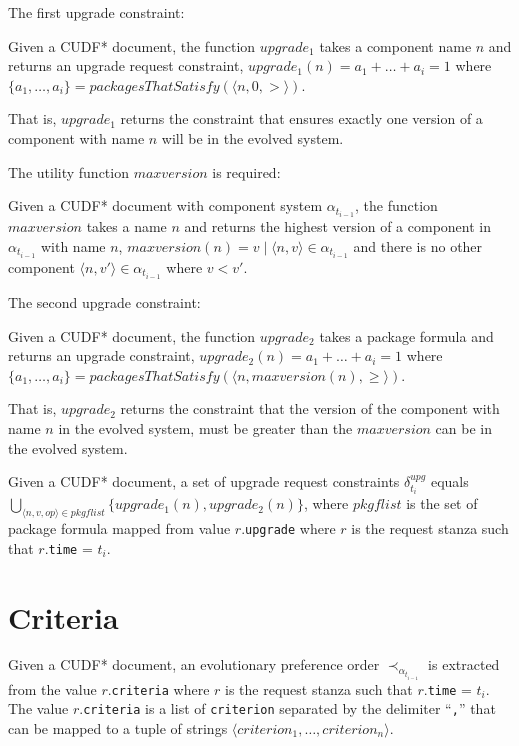 The first upgrade constraint:
\begin{defs}
Given a CUDF* document, the function  $upgrade_1$ takes a component name $n$ and returns an upgrade request constraint, 
$upgrade_1(n) = a_1 + \ldots + a_i = 1$ where $\{a_1,\ldots,a_i\} = packagesThatSatisfy(\langle n,0,>\rangle)$. 
\end{defs}
That is, $upgrade_1$ returns the constraint that ensures exactly one version of a component with name $n$ will be in the evolved system.

The utility function $maxversion$ is required:
\begin{defs}
Given a CUDF* document with component system $\alpha_{t_{i-1}}$, the function $maxversion$ takes a name $n$ and returns the highest version of a component in $\alpha_{t_{i-1}}$ with name $n$,
$maxversion(n) = v  \mid \langle n,v \rangle \in \alpha_{t_{i-1}}$ and there is no other component $\langle n,v' \rangle \in \alpha_{t_{i-1}}$ where $v < v'$.
\end{defs}

The second upgrade constraint:
\begin{defs}
Given a CUDF* document, the function $upgrade_2$ takes a package formula and returns an upgrade constraint,
$upgrade_2(n) = a_1 + \ldots + a_i = 1$ where $\{a_1,\ldots,a_i\} = packagesThatSatisfy(\langle n,maxversion(n),\geq\rangle)$. 
\end{defs}
That is, $upgrade_2$ returns the constraint that the version of the component with name $n$ in the evolved system, must be greater than the $maxversion$ can be in the evolved system.

\begin{defs}
Given a CUDF* document, a set of upgrade request constraints $\delta_{t_i}^{upg}$ equals $\bigcup \limits_{\langle n,v,op \rangle \in pkgflist} \{upgrade_1(n),upgrade_2(n)\}$, 
where $pkgflist$ is the set of package formula mapped from value $r$.\texttt{upgrade} where $r$ is the request stanza such that $r$.\texttt{time} = $t_i$.
\end{defs}

\section{Criteria}
Given a CUDF* document, an evolutionary preference order $\prec_{\alpha_{t_{i-1}}}$ is extracted from the value $r$.\texttt{criteria} where $r$ is the request stanza such that $r$.\texttt{time} = $t_i$.
The value $r$.\texttt{criteria} is a list of \verb+criterion+ separated by the delimiter ``\verb+,+'' that can be mapped to a tuple of strings $\langle criterion_1, \ldots, criterion_n \rangle$.

